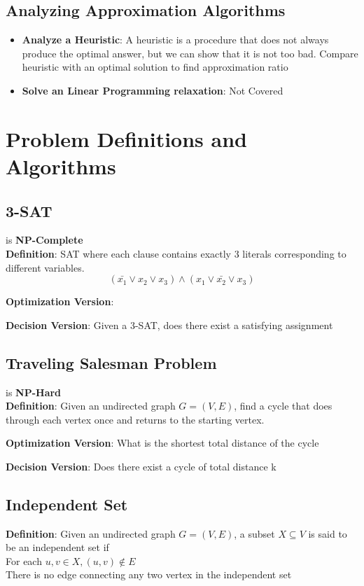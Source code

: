 \documentclass{article}
\begin{document}
\begin{multicols*}{4}
\subsection{Analyzing Approximation Algorithms}
\begin{itemize}
	\item \textbf{Analyze a Heuristic}: A heuristic is a procedure that does not always produce the optimal answer, but we can show that it is not too bad. Compare heuristic with an optimal solution to find approximation ratio
	\item \textbf{Solve an Linear Programming relaxation}: Not Covered
\end{itemize}

\section{Problem Definitions and Algorithms}

\subsection{3-SAT}
is \textbf{NP-Complete}\\
\textbf{Definition}: SAT where each clause contains exactly 3 literals corresponding to different variables.\\
$$(\bar{x_1}\vee x_2 \vee x_3)\wedge (x_1 \vee \bar{x_2} \vee x_3)$$

\textbf{Optimization Version}:

\textbf{Decision Version}: Given a 3-SAT, does there exist a satisfying assignment

\subsection{Traveling Salesman Problem}
is \textbf{NP-Hard}\\
\textbf{Definition}: Given an undirected graph $G=(V,E)$, find a cycle that does through each vertex once and returns to the starting vertex.

\textbf{Optimization Version}: What is the shortest total distance of the cycle

\textbf{Decision Version}: Does there exist a cycle of total distance k

\subsection{Independent Set}
\textbf{Definition}: Given an undirected graph $G=(V,E)$, a subset $X\subseteq V$ is said to be an independent set if\\
For each $u,v\in X, (u,v)\notin E$\\
There is no edge connecting any two vertex in the independent set


\end{multicols*}
\end{document}
